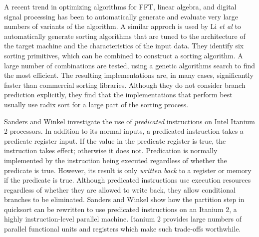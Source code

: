 \documentclass[acmtocl]{acmtrans2m}
\begin{document}
A recent trend in optimizing algorithms for FFT, linear algebra, and digital
signal processing has been to automatically generate and evaluate very large
numbers of variants of the algorithm.  A similar approch is used by Li
\textit{et al} \citeyear{Li+05} to automatically generate sorting algorithms
that are tuned to the architecture of the target machine and the characteristics
of the input data. They identify six sorting primitives, which can be combined
to construct a sorting algorithm.  A large number of combinations are tested,
using a genetic algorithms search to find the most efficient. The resulting
implementations are, in many cases, significantly faster than commercial sorting
libraries.  Although they do not consider branch prediction explicitly, they
find that the implementations that perform best usually use radix sort for a
large part of the sorting process.

Sanders and Winkel \citeyear{Sanders+04} investigate the use of
\emph{predicated} instructions on Intel Itanium 2 processors. In addition to its
normal inputs, a predicated instruction takes a predicate register input. If the
value in the predicate register is true, the instruction takes effect; otherwise
it does not. Predication is normally implemented by the instruction being
executed regardless of whether the predicate is true. However, its result is
only \textit{written back} to a register or memory if the predicate is true.
Although predicated instructions use execution resources regardless of whether
they are allowed to write back, they allow conditional branches to be
eliminated.  Sanders and Winkel show how the partition step in quicksort can be
rewritten to use predicated instructions on an Itanium 2, a highly
instruction-level parallel machine. Itanium 2 provides large numbers of parallel
functional units and registers which make such trade-offs worthwhile. 
\end{document}
